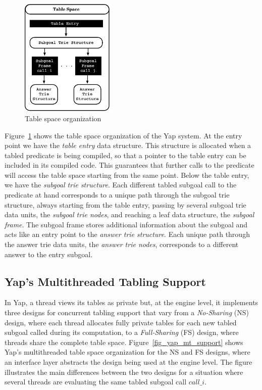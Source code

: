 \documentclass{llncs}
\begin{document}
\begin{figure}
\vspace{-\intextsep}
\centering
\includegraphics[width=4.5cm]{figures/table-space.pdf}
\caption{Table space organization}
\label{fig_table_space}
\vspace{-0.5\intextsep}
\end{figure}

Figure~\ref{fig_table_space} shows the table space organization of the
Yap system. At the entry point we have the \emph{table entry} data
structure. This structure is allocated when a tabled predicate is
being compiled, so that a pointer to the table entry can be included
in its compiled code. This guarantees that further calls to the
predicate will access the table space starting from the same
point. Below the table entry, we have the \emph{subgoal trie
  structure}. Each different tabled subgoal call to the predicate at
hand corresponds to a unique path through the subgoal trie structure,
always starting from the table entry, passing by several subgoal trie
data units, the \emph{subgoal trie nodes}, and reaching a leaf data
structure, the \emph{subgoal frame}. The subgoal frame stores
additional information about the subgoal and acts like an entry point
to the \emph{answer trie structure}. Each unique path through the
answer trie data units, the \emph{answer trie nodes}, corresponds to a
different answer to the entry subgoal.


\subsection{Yap's Multithreaded Tabling Support}

In Yap, a thread views its tables as private but, at the engine level,
it implements three designs for concurrent tabling support that vary
from a \emph{No-Sharing} (NS) design, where each thread allocates
fully private tables for each new tabled subgoal called during its
computation, to a \emph{Full-Sharing} (FS) design, where threads share
the complete table space. Figure~\ref{fig_yap_mt_support} shows Yap's
multithreaded table space organization for the NS and FS designs,
where an interface layer abstracts the design being used at the engine
level. The figure illustrates the main differences between the two
designs for a situation where several threads are evaluating the same
tabled subgoal call $call\_i$.
\end{document}
